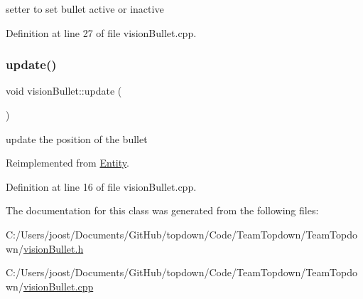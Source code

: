 setter to set bullet active or inactive 

Definition at line 27 of file vision\+Bullet.\+cpp.

\mbox{\label{classvision_bullet_a425ac17ace4a29879a9a204ffc29021d}} 
\subsubsection{\texorpdfstring{update()}{update()}}
{\footnotesize\ttfamily void vision\+Bullet\+::update (\begin{DoxyParamCaption}{ }\end{DoxyParamCaption})\hspace{0.3cm}{\ttfamily [virtual]}}

update the position of the bullet 

Reimplemented from \hyperlink{class_entity_aed73e98b980b85833428c935cc1c69f8}{Entity}.



Definition at line 16 of file vision\+Bullet.\+cpp.



The documentation for this class was generated from the following files\+:\begin{DoxyCompactItemize}
\item 
C\+:/\+Users/joost/\+Documents/\+Git\+Hub/topdown/\+Code/\+Team\+Topdown/\+Team\+Topdown/\hyperlink{vision_bullet_8h}{vision\+Bullet.\+h}\item 
C\+:/\+Users/joost/\+Documents/\+Git\+Hub/topdown/\+Code/\+Team\+Topdown/\+Team\+Topdown/\hyperlink{vision_bullet_8cpp}{vision\+Bullet.\+cpp}\end{DoxyCompactItemize}
